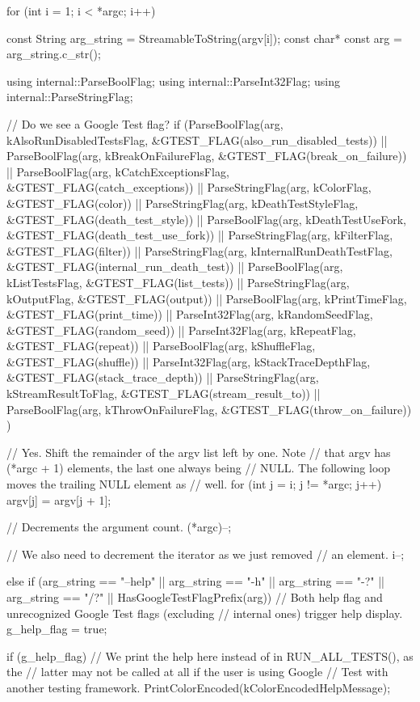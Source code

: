 \begin{DoxyCode}
                                                              {
  for (int i = 1; i < *argc; i++) {
    const String arg_string = StreamableToString(argv[i]);
    const char* const arg = arg_string.c_str();

    using internal::ParseBoolFlag;
    using internal::ParseInt32Flag;
    using internal::ParseStringFlag;

    // Do we see a Google Test flag?
    if (ParseBoolFlag(arg, kAlsoRunDisabledTestsFlag,
                      &GTEST_FLAG(also_run_disabled_tests)) ||
        ParseBoolFlag(arg, kBreakOnFailureFlag,
                      &GTEST_FLAG(break_on_failure)) ||
        ParseBoolFlag(arg, kCatchExceptionsFlag,
                      &GTEST_FLAG(catch_exceptions)) ||
        ParseStringFlag(arg, kColorFlag, &GTEST_FLAG(color)) ||
        ParseStringFlag(arg, kDeathTestStyleFlag,
                        &GTEST_FLAG(death_test_style)) ||
        ParseBoolFlag(arg, kDeathTestUseFork,
                      &GTEST_FLAG(death_test_use_fork)) ||
        ParseStringFlag(arg, kFilterFlag, &GTEST_FLAG(filter)) ||
        ParseStringFlag(arg, kInternalRunDeathTestFlag,
                        &GTEST_FLAG(internal_run_death_test)) ||
        ParseBoolFlag(arg, kListTestsFlag, &GTEST_FLAG(list_tests)) ||
        ParseStringFlag(arg, kOutputFlag, &GTEST_FLAG(output)) ||
        ParseBoolFlag(arg, kPrintTimeFlag, &GTEST_FLAG(print_time)) ||
        ParseInt32Flag(arg, kRandomSeedFlag, &GTEST_FLAG(random_seed)) ||
        ParseInt32Flag(arg, kRepeatFlag, &GTEST_FLAG(repeat)) ||
        ParseBoolFlag(arg, kShuffleFlag, &GTEST_FLAG(shuffle)) ||
        ParseInt32Flag(arg, kStackTraceDepthFlag,
                       &GTEST_FLAG(stack_trace_depth)) ||
        ParseStringFlag(arg, kStreamResultToFlag,
                        &GTEST_FLAG(stream_result_to)) ||
        ParseBoolFlag(arg, kThrowOnFailureFlag,
                      &GTEST_FLAG(throw_on_failure))
        ) {
      // Yes.  Shift the remainder of the argv list left by one.  Note
      // that argv has (*argc + 1) elements, the last one always being
      // NULL.  The following loop moves the trailing NULL element as
      // well.
      for (int j = i; j != *argc; j++) {
        argv[j] = argv[j + 1];
      }

      // Decrements the argument count.
      (*argc)--;

      // We also need to decrement the iterator as we just removed
      // an element.
      i--;
    } else if (arg_string == "--help" || arg_string == "-h" ||
               arg_string == "-?" || arg_string == "/?" ||
               HasGoogleTestFlagPrefix(arg)) {
      // Both help flag and unrecognized Google Test flags (excluding
      // internal ones) trigger help display.
      g_help_flag = true;
    }
  }

  if (g_help_flag) {
    // We print the help here instead of in RUN_ALL_TESTS(), as the
    // latter may not be called at all if the user is using Google
    // Test with another testing framework.
    PrintColorEncoded(kColorEncodedHelpMessage);
  }
}
\end{DoxyCode}
